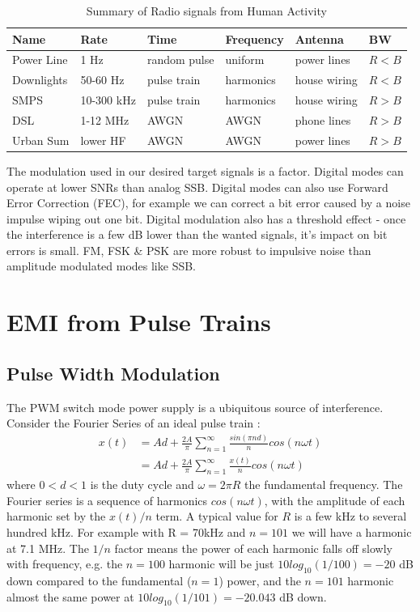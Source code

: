 \documentclass{article}
\begin{document}
\begin{table}[h]
\centering
\begin{tabular}{l l l l l l}
 \hline
 Name & Rate & Time & Frequency & Antenna & BW \\
 \hline
 Power Line & 1 Hz & random pulse & uniform & power lines & $R < B$ \\
 Downlights & 50-60 Hz & pulse train & harmonics & house wiring & $R < B$ \\
 SMPS & 10-300 kHz & pulse train & harmonics & house wiring & $R > B$ \\
 DSL & 1-12 MHz & AWGN & AWGN & phone lines & $R > B$ \\
 Urban Sum & lower HF & AWGN & AWGN & power lines & $R > B$ \\
 \hline
\end{tabular}
\caption{Summary of Radio signals from Human Activity}
\label{table:human_noise}
\end{table}

The modulation used in our desired target signals is a factor.  Digital modes can operate at lower SNRs than analog SSB.  Digital modes can also use Forward Error Correction (FEC), for example we can correct a bit error caused by a noise impulse wiping out one bit.  Digital modulation also has a threshold effect - once the interference is a few dB lower than the wanted signals, it's impact on bit errors is small. FM, FSK \& PSK are more robust to impulsive noise than amplitude modulated modes like SSB.

\section{EMI from Pulse Trains}
\label{pwm}

\subsection{Pulse Width Modulation}
\label{smps}

The PWM switch mode power supply is a ubiquitous source of interference.  Consider the Fourier Series of an ideal pulse train \cite{wikipedia_pulse}:
\begin{equation} \label{eq_pwm}
\begin{split}
x(t) &= Ad+\frac{2A}{\pi} \sum_{n=1}^{\infty} \frac{sin(\pi n d)}{n}cos(n \omega t) \\
     &= Ad+\frac{2A}{\pi} \sum_{n=1}^{\infty} \frac{x(t)}{n} cos(n \omega t)
\end{split}
\end{equation}
where $0<d<1$ is the duty cycle and $\omega=2 \pi R$ the fundamental frequency.  The Fourier series is a sequence of harmonics $cos(n \omega t)$, with the amplitude of each harmonic set by the $x(t)/n$ term. A typical value for $R$ is a few kHz to several hundred kHz. For example with R = 70kHz and $n=101$ we will have a harmonic at 7.1 MHz. The $1/n$ factor means the power of each harmonic falls off slowly with frequency, e.g. the $n=100$ harmonic will be just $10log_{10}(1/100)=-20$ dB down compared to the fundamental ($n=1$) power, and the $n=101$ harmonic almost the same power at $10log_{10}(1/101)=-20.043$ dB down.
\end{document}

